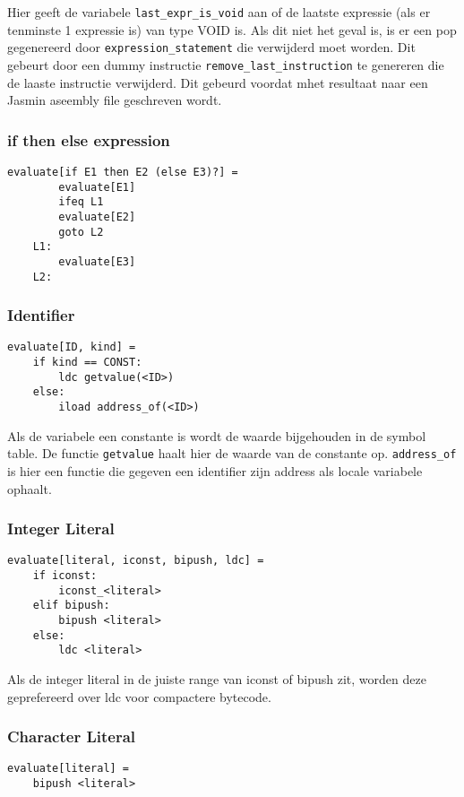 \documentclass[]{article}
\begin{document}
Hier geeft de variabele \texttt{last\_expr\_is\_void} aan of de laatste expressie (als er tenminste 1 expressie is) van type VOID is. Als dit niet het geval is, is er een pop gegenereerd door \texttt{expression\_statement} die verwijderd moet worden. Dit gebeurt door een dummy instructie \texttt{remove\_last\_instruction} te genereren die de laaste instructie verwijderd. Dit gebeurd voordat mhet resultaat naar een Jasmin aseembly file geschreven wordt.

\subsubsection{if then else expression}

\begin{verbatim}
evaluate[if E1 then E2 (else E3)?] =
        evaluate[E1]
        ifeq L1
        evaluate[E2]
        goto L2
    L1:
        evaluate[E3]
    L2:
\end{verbatim}

\subsubsection{Identifier}
\label{Identifier}

\begin{verbatim}
evaluate[ID, kind] =
    if kind == CONST:
        ldc getvalue(<ID>)
    else:
        iload address_of(<ID>)
\end{verbatim}

Als de variabele een constante is wordt de waarde bijgehouden in de symbol table. De functie \texttt{getvalue} haalt hier de waarde van de constante op.
\texttt{address\_of} is hier een functie die gegeven een identifier zijn address als locale variabele ophaalt.

\subsubsection{Integer Literal}
\begin{verbatim}
evaluate[literal, iconst, bipush, ldc] =
    if iconst:	
        iconst_<literal>
    elif bipush:
        bipush <literal>
    else:	
        ldc <literal>
\end{verbatim}

Als de integer literal in de juiste range van iconst of bipush zit, worden deze geprefereerd over ldc voor compactere bytecode.

\subsubsection{Character Literal}
\begin{verbatim}
evaluate[literal] =
    bipush <literal>
\end{verbatim}
\end{document}
